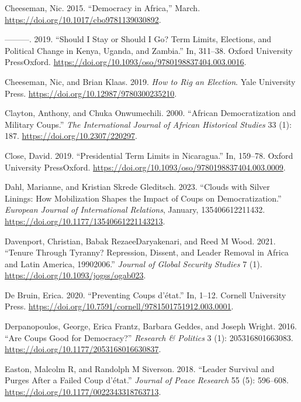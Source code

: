\documentclass[
  12pt,
]{report}
\newlength{\cslhangindent}
\newenvironment{CSLReferences}[2] %
 {\begin{list}{}{%
  \setlength{\itemindent}{0pt}
  \setlength{\leftmargin}{0pt}
  \setlength{\parsep}{0pt}
  \ifodd #1
   \setlength{\leftmargin}{\cslhangindent}
   \setlength{\itemindent}{-1\cslhangindent}
  \fi
  \setlength{\itemsep}{#2\baselineskip}}}
 {\end{list}}
\begin{document}
\begin{CSLReferences}{1}{0}
Cheeseman, Nic. 2015. {``Democracy in Africa,''} March.
\url{https://doi.org/10.1017/cbo9781139030892}.

---------. 2019. {``Should I Stay or Should I Go? Term Limits,
Elections, and Political Change in Kenya, Uganda, and Zambia.''} In,
311--38. Oxford University PressOxford.
\url{https://doi.org/10.1093/oso/9780198837404.003.0016}.

Cheeseman, Nic, and Brian Klaas. 2019. \emph{How to Rig an Election}.
Yale University Press. \url{https://doi.org/10.12987/9780300235210}.

Clayton, Anthony, and Chuka Onwumechili. 2000. {``African
Democratization and Military Coups.''} \emph{The International Journal
of African Historical Studies} 33 (1): 187.
\url{https://doi.org/10.2307/220297}.

Close, David. 2019. {``Presidential Term Limits in Nicaragua.''} In,
159--78. Oxford University PressOxford.
\url{https://doi.org/10.1093/oso/9780198837404.003.0009}.

Dahl, Marianne, and Kristian Skrede Gleditsch. 2023. {``Clouds with
Silver Linings: How Mobilization Shapes the Impact of Coups on
Democratization.''} \emph{European Journal of International Relations},
January, 135406612211432.
\url{https://doi.org/10.1177/13540661221143213}.

Davenport, Christian, Babak RezaeeDaryakenari, and Reed M Wood. 2021.
{``Tenure Through Tyranny? Repression, Dissent, and Leader Removal in
Africa and Latin America, 1990{\textendash}2006.''} \emph{Journal of
Global Security Studies} 7 (1).
\url{https://doi.org/10.1093/jogss/ogab023}.

De Bruin, Erica. 2020. {``Preventing Coups d{'}état.''} In, 1--12.
Cornell University Press.
\url{https://doi.org/10.7591/cornell/9781501751912.003.0001}.

Derpanopoulos, George, Erica Frantz, Barbara Geddes, and Joseph Wright.
2016. {``Are Coups Good for Democracy?''} \emph{Research \& Politics} 3
(1): 205316801663083. \url{https://doi.org/10.1177/2053168016630837}.

Easton, Malcolm R, and Randolph M Siverson. 2018. {``Leader Survival and
Purges After a Failed Coup d{'}état.''} \emph{Journal of Peace Research}
55 (5): 596--608. \url{https://doi.org/10.1177/0022343318763713}.


\end{CSLReferences}
\end{document}
